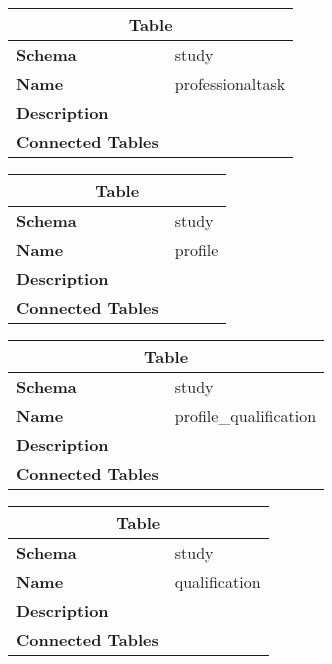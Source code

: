 \begin{table}[H]
	\renewcommand{\arraystretch}{2}
	\centering
	\begin{tabular}{|p{}|p{}|}
		\hline
		\multicolumn{2}{|c|}{\textbf{Table}} \\ \hline
		\textbf{Schema}               & study \\ \hline
		\textbf{Name}                 & professionaltask \\ \hline
		\textbf{Description}          &      \\ \hline
		\textbf{Connected Tables}     &      \\ \hline
	\end{tabular}
\end{table}

\begin{table}[H]
	\renewcommand{\arraystretch}{2}
	\centering
	\begin{tabular}{|p{}|p{}|}
		\hline
		\multicolumn{2}{|c|}{\textbf{Table}} \\ \hline
		\textbf{Schema}               & study \\ \hline
		\textbf{Name}                 & profile \\ \hline
		\textbf{Description}          &      \\ \hline
		\textbf{Connected Tables}     &      \\ \hline
	\end{tabular}
\end{table}

\begin{table}[H]
	\renewcommand{\arraystretch}{2}
	\centering
	\begin{tabular}{|p{}|p{}|}
		\hline
		\multicolumn{2}{|c|}{\textbf{Table}} \\ \hline
		\textbf{Schema}               & study \\ \hline
		\textbf{Name}                 & profile\_qualification \\ \hline
		\textbf{Description}          &      \\ \hline
		\textbf{Connected Tables}     &      \\ \hline
	\end{tabular}
\end{table}

\begin{table}[H]
	\renewcommand{\arraystretch}{2}
	\centering
	\begin{tabular}{|p{}|p{}|}
		\hline
		\multicolumn{2}{|c|}{\textbf{Table}} \\ \hline
		\textbf{Schema}               & study \\ \hline
		\textbf{Name}                 & qualification \\ \hline
		\textbf{Description}          &      \\ \hline
		\textbf{Connected Tables}     &      \\ \hline
	\end{tabular}
\end{table}

